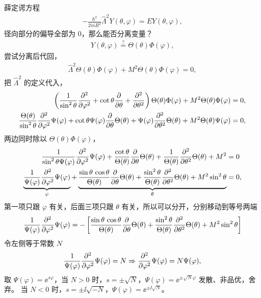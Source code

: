 薛定谔方程
\begin{align}
    -\frac{\hbar^2}{2mR^2} \hat \Lambda^2 Y(\theta,\varphi) = E Y(\theta, \varphi), 
\end{align}
径向部分的偏导全部为 0，那么能否分离变量？
\begin{align}
    Y(\theta,\varphi) \overset{?}{=} \Theta(\theta) \Phi(\varphi),
\end{align}
尝试分离后代回，
\begin{align}
    \hat \Lambda^2  \Theta(\theta) \Phi(\varphi) + M^2  \Theta(\theta) \Phi(\varphi) = 0,
\end{align}
把 $\hat \Lambda^2$ 的定义代入，
\begin{align}
    \left(\frac1{\sin^2\theta} \pdv[2]{\varphi} + \cot\theta \pdv{\theta} + \pdv[2]{\theta}\right) \Theta(\theta) \Phi(\varphi) + M^2  \Theta(\theta) \Phi(\varphi) = 0, \notag\\
    \frac{\Theta(\theta)}{\sin^2\theta} \pdv[2]{\varphi} \Psi(\varphi) + \cot\theta \Psi(\varphi) \pdv{\theta} \Theta(\theta) + \Psi(\varphi) \pdv[2]{\theta} \Theta(\theta) + M^2 \Theta(\theta) \Psi(\varphi) = 0,
\end{align}
两边同时除以 $\Theta(\theta) \Phi(\varphi)$，
\begin{align}
    \frac{1}{\sin^2\theta \Psi(\varphi)} \pdv[2]{\varphi} \Psi(\varphi) + \frac{\cot\theta}{\Theta(\theta)} \pdv{\theta} \Theta(\theta) + \frac1{\Theta(\theta)} \pdv[2]{\theta} \Theta(\theta) + M^2 &= 0 \notag\\
    \underbrace{\frac{1}{\Psi(\varphi)} \pdv[2]{\varphi} \Psi(\varphi)}_{\varphi} 
    + 
    \underbrace{\frac{\sin\theta\,\cos\theta}{\Theta(\theta)} \pdv{\theta} \Theta(\theta) + \frac {\sin^2\theta}{\Theta(\theta)} \pdv[2]{\theta} \Theta(\theta) + M^2 \sin^2\theta}_{\theta}
    &= 0,
\end{align}
第一项只跟 $\varphi$ 有关，后面三项只跟 $\theta$ 有关，所以可以分开，分别移动到等号两端
\begin{align}
    \frac{1}{\Psi(\varphi)} \pdv[2]{\varphi} \Psi(\varphi) = - \left[
        \frac{\sin\theta\,\cos\theta}{\Theta(\theta)} \pdv{\theta} \Theta(\theta) + \frac {\sin^2\theta}{\Theta(\theta)} \pdv[2]{\theta} \Theta(\theta) + M^2 \sin^2\theta
    \right]
    \label{eq:sphere_surface_sep_done}
\end{align}
令左侧等于常数 $N$
\begin{align}
    \frac{1}{\Psi(\varphi)} \pdv[2]{\varphi} \Psi(\varphi) = N \Rightarrow  \pdv[2]{\varphi} \Psi(\varphi) = N \Psi(\varphi), 
\end{align}
取 $\Psi(\varphi) = \ee^{s\varphi}$，当 $N>0$ 时，$s = \pm\sqrt N$，$\Psi(\varphi) = \ee^{\pm \sqrt N \varphi}$ 发散、非品优，舍弃。%
当 $N<0$ 时，$s = \pm\ii\sqrt{-N}$，$\Psi(\varphi) = \ee^{\pm\ii\sqrt N}$。

